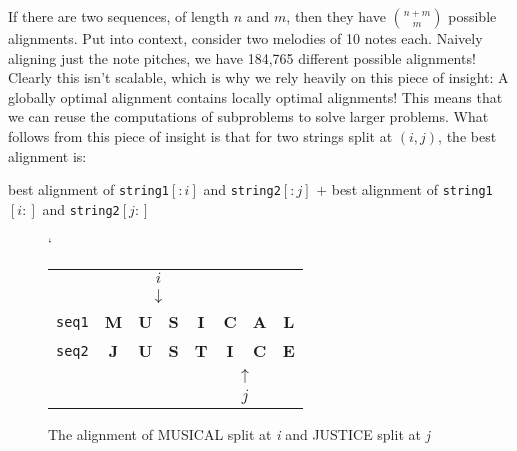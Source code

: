 If there are two sequences, of length $n$ and $m$, then they have $\binom{n+m}{m}$ possible alignments. Put into context, consider two melodies of 10 notes each. Naively aligning just the note pitches, we have 184,765 different possible alignments! Clearly this isn't scalable, which is why we rely heavily on this piece of insight: A globally optimal alignment contains locally optimal alignments! This means that we can reuse the computations of subproblems to solve larger problems. What follows from this piece of insight is that for two strings split at $(i, j)$, the best alignment is:

\begin{center}
best alignment of \texttt{string1}$[:i]$ and \texttt{string2}$[:j]$ 
$+$ best alignment of \texttt{string1}$[i:]$ and \texttt{string2}$[j:]$
\end{center}

\begin{figure}[!h]`
\centering
\begin{tabular}{lccccccc}
   & {\color[HTML]{333333} \textbf{}} & \multicolumn{2}{c}{{\color[HTML]{333333} $i$}}          & {\color[HTML]{333333} \textbf{}} & {\color[HTML]{333333} \textbf{}} & {\color[HTML]{333333} \textbf{}} & {\color[HTML]{333333} \textbf{}} \\
   & {\color[HTML]{333333} \textbf{}} & \multicolumn{2}{c}{{\color[HTML]{333333} $\downarrow$}} & {\color[HTML]{333333} \textbf{}} & {\color[HTML]{333333} \textbf{}} & {\color[HTML]{333333} \textbf{}} & {\color[HTML]{333333} \textbf{}} \\
\texttt{seq1} & \textbf{M}                       & \textbf{U}                  & \textbf{S}                & \textbf{I}                       & \textbf{C}                       & \textbf{A}                       & \textbf{L}                       \\
\texttt{seq2} & \textbf{J}                       & \textbf{U}                  & \textbf{S}                & \textbf{T}                       & \textbf{I}                       & \textbf{C}                       & \textbf{E}                       \\
   &                                  &                             &                           &                                  & \multicolumn{2}{c}{$\uparrow$}                                      &                                  \\
   &                                  &                             &                           &                                  & \multicolumn{2}{c}{$j$}                                             &                                 
\end{tabular}
\caption{The alignment of MUSICAL split at \textit{i} and JUSTICE split at \textit{j}}
\label{indexed musical and justice}
\end{figure}

